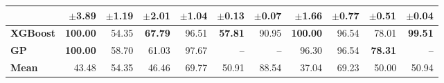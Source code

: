 \begin{table}[!htbp]
\begin{tabular}{lrrrrrrrrrr}
 & $\pm$3.89 & $\pm$1.19 & $\pm$2.01 & $\pm$1.04 & $\pm$0.13 & $\pm$0.07 & $\pm$1.66 & $\pm$0.77 & $\pm$0.51 & $\pm$0.04 \\
\midrule
\textbf{XGBoost} & \textbf{100.00} & 54.35 & \textbf{67.79} & 96.51 & \textbf{57.81} & 90.95 & \textbf{100.00} & 96.54 & 78.01 & \textbf{99.51} \\
\midrule
\textbf{GP} & \textbf{100.00} & 58.70 & 61.03 & 97.67 & -- & -- & 96.30 & 96.54 & \textbf{78.31} & -- \\
\midrule
\textbf{Mean} & 43.48 & 54.35 & 46.46 & 69.77 & 50.91 & 88.54 & 37.04 & 69.23 & 50.00 & 50.94 \\
\bottomrule
\end{tabular}
\end{table}